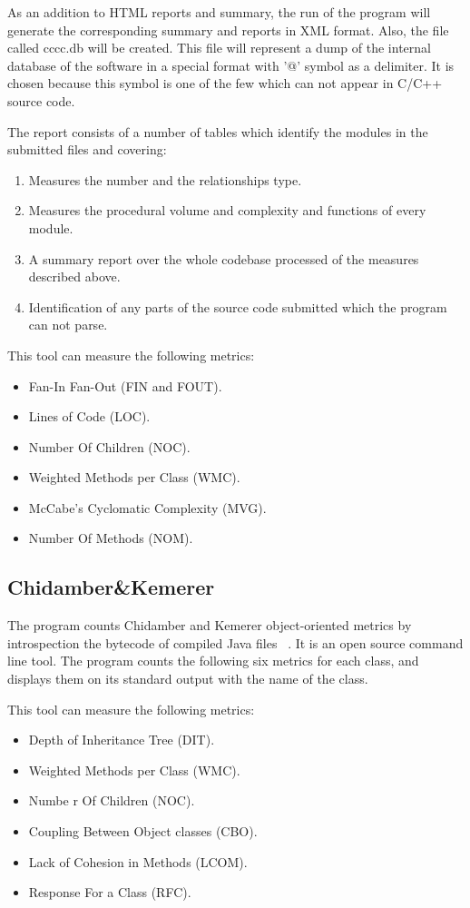 As an addition to HTML reports and summary, the run of the program will generate the corresponding summary and reports in XML format. Also, the file called cccc.db will be created. This file will represent a dump of the internal database of the software in a special format with '@' symbol as a delimiter. It is chosen because this symbol is one of the few which can not appear in C/C++ source code.

The report consists of a number of tables which identify the modules in the submitted files and covering:
\begin{enumerate}
	\item Measures the number and the relationships type.
	\item Measures the procedural volume and complexity and functions of every module. 
	\item A summary report over the whole codebase processed of the measures described above.
	\item Identification of any parts of the source code submitted which the program can not parse.
\end{enumerate}

This tool can measure the following metrics:
\begin{itemize}
	\item Fan-In Fan-Out (FIN and FOUT).
	\item Lines of Code (LOC). 
	\item Number Of Children (NOC).
	\item Weighted Methods per Class (WMC).
	\item McCabe's Cyclomatic Complexity (MVG).
	\item Number Of Methods (NOM).
\end{itemize}

\subsection{Chidamber\&Kemerer}

The program counts Chidamber and Kemerer object-oriented metrics by introspection the bytecode of compiled Java files ~\cite{ck1}. It is an open source command line tool. The program counts the following six metrics for each class, and displays them on its standard output with the name of the class.

This tool can measure the following metrics:

\begin{itemize}
	\item Depth of Inheritance Tree (DIT).
	\item Weighted Methods per Class (WMC).
	\item Numbe r Of Children (NOC).
	\item Coupling Between Object classes (CBO).
	\item Lack of Cohesion in Methods (LCOM).
	\item Response For a Class (RFC).
\end{itemize}

